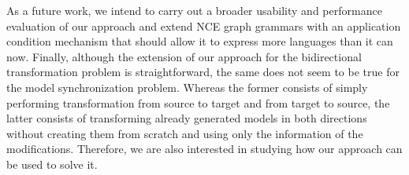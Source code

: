 \documentclass[runningheads]{llncs}
\begin{document}
As a future work, we intend to carry out a broader usability and performance evaluation of our approach and extend NCE graph grammars with an application condition mechanism that should allow it to express more languages than it can now. Finally, although the extension of our approach for the bidirectional transformation problem is straightforward, the same does not seem to be true for the model synchronization problem. Whereas the former consists of simply performing transformation from source to target and from target to source, the latter consists of transforming already generated models in both directions without creating them from scratch and using only the information of the modifications. Therefore, we are also interested in studying how our approach can be used to solve it.

%
%
%


\end{document}

